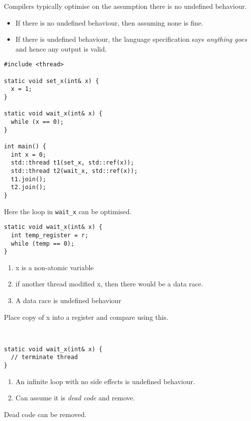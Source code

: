 
Compilers typically optimise on the assumption there is no undefined behaviour.
\begin{itemize}
	\item If there is no undefined behaviour, then assuming none is fine.
	\item If there is undefined behaviour, the language specification says \textit{anything goes} and hence any output is valid.
\end{itemize}

\begin{verbatim}
#include <thread>

static void set_x(int& x) {
  x = 1;
}

static void wait_x(int& x) {
  while (x == 0);
}

int main() {
  int x = 0;
  std::thread t1(set_x, std::ref(x));
  std::thread t2(wait_x, std::ref(x));
  t1.join();
  t2.join();
}
\end{verbatim}
Here the loop in \texttt{wait_x} can be optimised.
\\\begin{minipage}{.5\textwidth}
	\begin{verbatim}
static void wait_x(int& x) {
  int temp_register = r; 
  while (temp == 0);
}
  \end{verbatim}
\end{minipage}
\hfill
\begin{minipage}{.48\textwidth}
	\begin{enumerate}
		\item x is a non-atomic variable
		\item if another thread modified x, then there would be a data race.
		\item A data race is undefined behaviour
	\end{enumerate}
	Place copy of x into a register and compare using this.
\end{minipage}
\\\begin{minipage}{.5\textwidth}
	\begin{verbatim}
static void wait_x(int& x) {
  // terminate thread
}
  \end{verbatim}
\end{minipage}
\hfill
\begin{minipage}{.48\textwidth}
	\begin{enumerate}
		\item An infinite loop with no side effects is undefined behaviour.
		\item Can assume it is \textit{dead code} and remove.
	\end{enumerate}
	Dead code can be removed.
\end{minipage}

